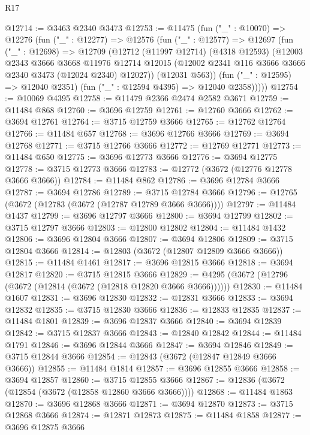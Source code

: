 \begin{lexlean}{R17}
\begin{coremodule}
@12714 := @3463 @2340 @3473
@12753 := @11475
    (fun ("_" : @10070) =>
    @12276
      (fun ("_" : @12277) =>
      @12576
        (fun ("_" : @12577) =>
        @12697
          (fun ("_" : @12698) =>
          @12709
            (@12712
              (@11997 @12714)
              (@4318 @12593)
              (@12003
                @2343
                @3666
                @3668
                @11976
                @12714
                @12015
                (@12002 @2341 @116 @3666 @3666 @2340 @3473 (@12024 @2340) @12027))
              (@12031 @563))
            (fun ("_" : @12595) => @12040 @2351)
            (fun ("_" : @12594 @4395) => @12040 @2358)))))
@12754 := @10069 @4395
@12758 := @11479 @2366 @2474 @2582 @3671
@12759 := @11484 @868
@12760 := @3696 @12759
@12761 := @12760 @3666
@12762 := @3694 @12761
@12764 := @3715 @12759 @3666
@12765 := @12762 @12764
@12766 := @11484 @657
@12768 := @3696 @12766 @3666
@12769 := @3694 @12768
@12771 := @3715 @12766 @3666
@12772 := @12769 @12771
@12773 := @11484 @650
@12775 := @3696 @12773 @3666
@12776 := @3694 @12775
@12778 := @3715 @12773 @3666
@12783 := @12772 (@3672 (@12776 @12778 @3666 @3666))
@12784 := @11484 @862
@12786 := @3696 @12784 @3666
@12787 := @3694 @12786
@12789 := @3715 @12784 @3666
@12796 := @12765 (@3672 (@12783 (@3672 (@12787 @12789 @3666 @3666))))
@12797 := @11484 @1437
@12799 := @3696 @12797 @3666
@12800 := @3694 @12799
@12802 := @3715 @12797 @3666
@12803 := @12800 @12802
@12804 := @11484 @1432
@12806 := @3696 @12804 @3666
@12807 := @3694 @12806
@12809 := @3715 @12804 @3666
@12814 := @12803 (@3672 (@12807 @12809 @3666 @3666))
@12815 := @11484 @1461
@12817 := @3696 @12815 @3666
@12818 := @3694 @12817
@12820 := @3715 @12815 @3666
@12829 := @4295 (@3672 (@12796 (@3672 (@12814 (@3672 (@12818 @12820 @3666 @3666))))))
@12830 := @11484 @1607
@12831 := @3696 @12830
@12832 := @12831 @3666
@12833 := @3694 @12832
@12835 := @3715 @12830 @3666
@12836 := @12833 @12835
@12837 := @11484 @1801
@12839 := @3696 @12837 @3666
@12840 := @3694 @12839
@12842 := @3715 @12837 @3666
@12843 := @12840 @12842
@12844 := @11484 @1791
@12846 := @3696 @12844 @3666
@12847 := @3694 @12846
@12849 := @3715 @12844 @3666
@12854 := @12843 (@3672 (@12847 @12849 @3666 @3666))
@12855 := @11484 @1814
@12857 := @3696 @12855 @3666
@12858 := @3694 @12857
@12860 := @3715 @12855 @3666
@12867 := @12836 (@3672 (@12854 (@3672 (@12858 @12860 @3666 @3666))))
@12868 := @11484 @1863
@12870 := @3696 @12868 @3666
@12871 := @3694 @12870
@12873 := @3715 @12868 @3666
@12874 := @12871 @12873
@12875 := @11484 @1858
@12877 := @3696 @12875 @3666

\end{coremodule}
\end{lexlean}
